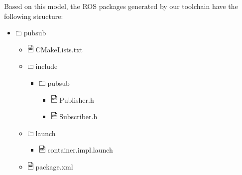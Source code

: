 Based on this model, the ROS packages generated by our toolchain have the following structure:
\begin{itemize}
\item[] \includegraphics[width=0.3cm]{gfx/tree/folder.png} pubsub
\begin{itemize}
\item[] \includegraphics[width=0.3cm]{gfx/tree/file_txt.png} CMakeLists.txt
\item[] \includegraphics[width=0.3cm]{gfx/tree/folder.png} include
\begin{itemize}
\item[] \includegraphics[width=0.3cm]{gfx/tree/folder.png} pubsub
\begin{itemize}
\item[] \includegraphics[width=0.3cm]{gfx/tree/file_cpp.png} Publisher.h
\item[] \includegraphics[width=0.3cm]{gfx/tree/file_cpp.png} Subscriber.h
\end{itemize}
\end{itemize}
\item[] \includegraphics[width=0.3cm]{gfx/tree/folder.png} launch
\begin{itemize}
\item[] \includegraphics[width=0.3cm]{gfx/tree/file_xml.png} container.impl.launch
\end{itemize}
\item[] \includegraphics[width=0.3cm]{gfx/tree/file_xml.png} package.xml

\end{itemize}
\end{itemize}

